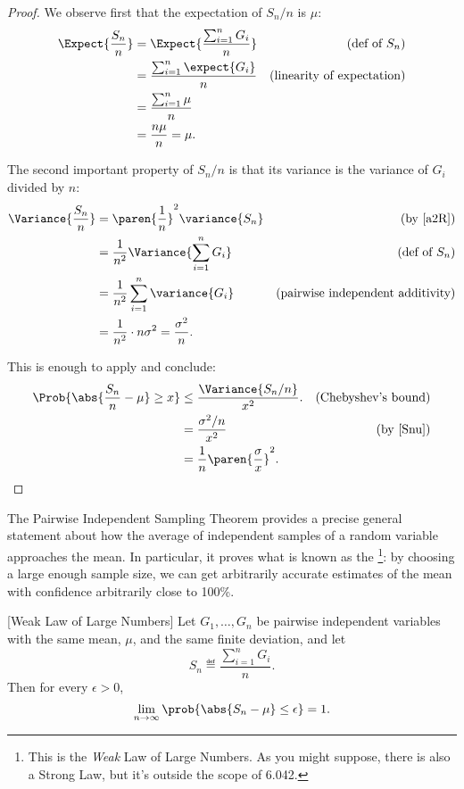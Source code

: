 \begin{proof}
We observe first that the expectation of $S_n/n$ is $\mu$:
\begin{align*}
\Expect{\frac{S_n}{n}} & = \Expect{\frac{\sum_{i=1}^n G_i}{n}}
         & \text{(def of $S_n$)}\\
 & = \frac{\sum_{i=1}^n \expect{G_i}}{n} 
     & \text{(linearity of expectation)}\\
 & = \frac{\sum_{i=1}^n \mu}{n}\\
 & = \frac{n\mu}{n} = \mu.
\end{align*}

The second important property of $S_n/n$ is that its variance is the
variance of $G_i$ divided by $n$:
\begin{align}
\Variance{\frac{S_n}{n}} & =  \paren{\frac{1}{n}}^2 \variance{S_n}
          & \mbox{(by~\eqref{a2R})}\notag\\
 & =  \frac{1}{n^2} \Variance{\sum_{i=1}^n G_i} 
          & \text{(def of $S_n$)}\notag\\
 & =  \frac{1}{n^2} \sum_{i=1}^n \variance{G_i}
        & \text{(pairwise independent additivity)}\notag\\
 & =  \frac{1}{n^2}\cdot n\sigma^2 =  \frac{\sigma^2}{n}.\label{Snu}
\end{align}

This is enough to apply  and conclude:
\begin{align*}
\Prob{\abs{\frac{S_n}{n} - \mu} \geq x} & \leq \frac{\Variance{S_n/n}}{x^2}.
       & \text{(Chebyshev's bound)}\\
    & = \frac{\sigma^2/n}{x^2} & \text{(by~\eqref{Snu})}\\
    & = \frac{1}{n} \paren{\frac{\sigma}{x}}^2.
\end{align*}

\end{proof}

The Pairwise Independent Sampling Theorem provides a precise general
statement about how the average of independent samples of a random
variable approaches the mean.  In particular, it proves what is known as
the \footnote{This is the  \emph{Weak} Law of Large Numbers.  As you might
  suppose, there is also a Strong Law, but it's outside the scope of
  6.042.}: by choosing a large enough sample size, we can get arbitrarily
accurate estimates of the mean with confidence arbitrarily close to 100\%.

\begin{corollary}\label{weaklaw}[Weak Law of Large Numbers]
  Let $G_1, \dots, G_n$ be pairwise independent variables with the same
  mean, $\mu$, and the same finite deviation, and let
\[
S_n \eqdef \frac{\sum_{i=1}^n G_i}{n}.
\]
Then for every $\epsilon > 0$,
\[
\lim_{n \rightarrow \infty}
        \prob{\abs{S_n - \mu}  \leq \epsilon} = 1.
\]
\end{corollary}

